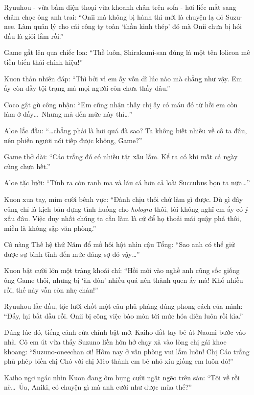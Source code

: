 \documentclass[../main.tex]{subfiles}
\begin{document}
Ryuuhou - vừa bấm điện thoại vừa khoanh chân trên sofa - hơi liếc mắt sang châm chọc ông anh trai: ``Onii mà không bị hành thì mới là chuyện lạ đó Suzu-nee. Làm quản lý cho cái công ty toàn `thần kinh thép' đó mà Onii chưa bị hói đầu là giỏi lắm rồi.''

Game gắt lên qua chiếc loa: ``Thề luôn, Shirakami-san đúng là một tên lolicon mê tiền biến thái chính hiệu!''

Kuon thản nhiên đáp: ``Thì bởi vì em ấy vốn dĩ lúc nào mà chẳng như vậy. Em ấy còn đầy tội trạng mà mọi người còn chưa thấy đâu.''

Coco gật gù công nhận: ``Em cũng nhận thấy chị ấy có máu đó từ hồi em còn làm ở đấy\dots\ Nhưng mà đến mức này thì\dots''

Aloe lắc đầu: ``\dots chẳng phải là hơi quá đà sao? Ta không biết nhiều về cô ta đâu, nên phiền ngươi nói tiếp được không, Game?''

Game thở dài: ``Cáo trắng đó có nhiều tật xấu lắm. Kể ra có khi mất cả ngày cũng chưa hết.''

Aloe tặc lưỡi: ``Tính ra còn ranh ma và láu cá hơn cả loài Succubus bọn ta nữa\dots''

Kuon xua tay, mỉm cười bênh vực: ``Đành chịu thôi chứ làm gì được. Dù gì đây cũng chỉ là kịch bản dựng tình huống cho \textit{hologra} thôi, tôi không nghĩ em ấy có ý xấu đâu. Việc duy nhất chúng ta cần làm là cứ để họ thoải mái quậy phá thôi, miễn là không sập văn phòng.''

Cô nàng Thế hệ thứ Năm đổ mồ hôi hột nhìn cậu Tổng: ``Sao anh có thể giữ được sự bình tĩnh đến mức đáng sợ đó vậy\dots''

Kuon bật cười lớn một tràng khoái chí: ``Hồi mới vào nghề anh cũng sốc giống ông Game thôi, nhưng bị `ăn đòn' nhiều quá nên thành quen ấy mà! Khổ nhiều rồi, thế này vẫn còn nhẹ chán!''

Ryuuhou lắc đầu, tặc lưỡi chốt một câu phũ phàng đúng phong cách của mình: ``Đấy, lại bắt đầu rồi. Onii bị công việc bào mòn tới mức hóa điên luôn rồi kìa.''

Đúng lúc đó, tiếng cánh cửa chính bật mở. Kaiho dắt tay bé út Naomi bước vào nhà. Cô em út vừa thấy Suzuno liền hớn hở chạy xà vào lòng chị gái khoe khoang: ``Suzuno-oneechan ơi! Hôm nay ở văn phòng vui lắm luôn! Chị Cáo trắng phù phép biến chị Chó với chị Mèo thành em bé nhỏ xíu giống em luôn đó!''

Kaiho ngơ ngác nhìn Kuon đang ôm bụng cười ngặt ngẽo trên sàn: ``Tôi về rồi nè\dots\ Ủa, Aniki, có chuyện gì mà anh cười như được mùa thế?''
\end{document}
